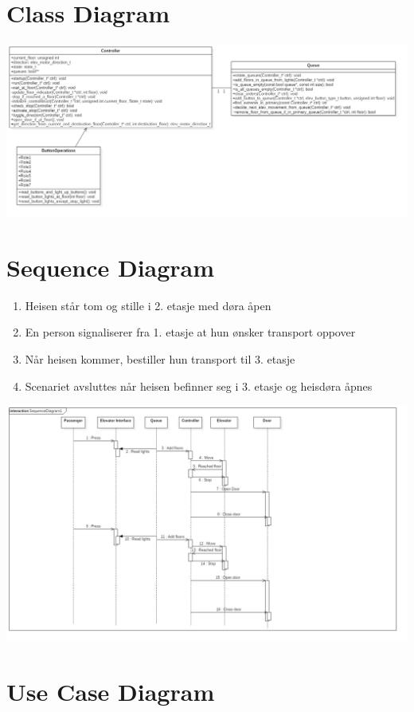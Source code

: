 \documentclass[a4paper, norsk]{article}
\begin{document}


\section{Class Diagram}
\includegraphics[width=\textwidth]{./Model__Main_0.png}


\section{Sequence Diagram}
\begin{enumerate}
\item Heisen står tom og stille i 2. etasje med døra åpen
\item En person signaliserer fra 1. etasje at hun ønsker transport oppover
\item Når heisen kommer, bestiller hun transport til 3. etasje
\item Scenariet avsluttes når heisen befinner seg i 3. etasje og heisdøra åpnes
\end{enumerate}
\includegraphics[width=\textwidth]{./Model__ButtonOperations__Interaction1__SequenceDiagram1_6.png}

\section{Use Case Diagram}
\end{document}
